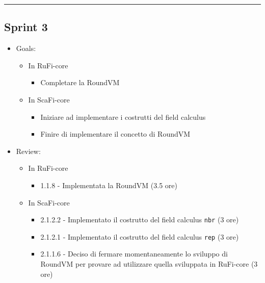\documentclass[12pt, a4paper]{article}
\begin{document}
\par\noindent\rule{\textwidth}{0.5pt}

\subsection*{Sprint 3}

\begin{itemize}
    \item Goals:
          \begin{itemize}
              \color{teal}
              \item In RuFi-core
                    \begin{itemize}
                        \item Completare la RoundVM
                    \end{itemize}
                    \color{cyan}
              \item In ScaFi-core
                    \begin{itemize}
                        \item Iniziare ad implementare i costrutti del field calculus
                        \item Finire di implementare il concetto di RoundVM
                    \end{itemize}
          \end{itemize}
    \item Review:
          \begin{itemize}
              \color{teal}
              \item In RuFi-core
                    \begin{itemize}
                        \item 1.1.8 - Implementata la RoundVM (3.5 ore)
                    \end{itemize}
                    \color{cyan}
              \item In ScaFi-core
                    \begin{itemize}
                        \item 2.1.2.2 - Implementato il costrutto del field calculus \texttt{nbr} (3 ore)
                        \item 2.1.2.1 - Implementato il costrutto del field calculus \texttt{rep} (3 ore)
                        \item 2.1.1.6 - Deciso di fermare momentaneamente lo sviluppo di RoundVM per provare ad utilizzare quella sviluppata in RuFi-core (3 ore)
                    \end{itemize}
          \end{itemize}
\end{itemize}
\end{document}
